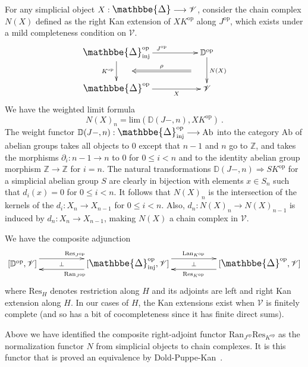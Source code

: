 \documentclass[a4paper,12pt,reqno]{amsart}
\def\makebigger#1#2#3{\hbox{#1$\mathsurround=0pt #2{#3}$}}
\def\bigger#1#2{{\relax\mathpalette{\makebigger#1}{#2}}}
\newcommand{\DelCat}{{\bigger\large{\mathbbe{\Delta}}}}
\theoremstyle{definition}
\theoremstyle{fact}
\theoremstyle{genquest}
\theoremstyle{step}
\newcommand{\lra}{\longrightarrow}
\newcommand{\Lra}{\Longrightarrow}
\def\CV{{\mathscr V}}
\begin{document}
For any simplicial object $X: \DelCat\lra \CV$, consider the
chain complex $N(X)$ defined as the right Kan extension of 
$X K^{\mathrm{op}}$ along $J^{\mathrm{op}}$, 
which exists under a mild completeness condition on $\CV$.
\begin{equation}
\begin{aligned}
\xymatrix{
\DelCat_{\mathrm{inj}}^{\mathrm{op}} \ar[d]_{K^{\mathrm{op}}}^(0.5){\phantom{aaa}}="1" \ar[rr]^{J^{\mathrm{op}}}  && \mathbb{D}^{\mathrm{op}}  \ar[d]^{N(X)}_(0.5){\phantom{aaa}}="2" \ar@{<=}"1";"2"^-{\rho}
\\
\DelCat^{\mathrm{op}}  \ar[rr]_-{X} && \CV 
}
\end{aligned}
\end{equation} 
We have the weighted limit formula
$$N(X)_n=\mathrm{lim}(\mathbb{D}(J-,n),XK^{\mathrm{op}}) \ .$$
The weight functor $\mathbb{D}(J-,n): \DelCat_{\mathrm{inj}}^{\mathrm{op}} \lra \mathrm{Ab}$
into the category $\mathrm{Ab}$ of abelian groups takes all objects to $0$
except that $n-1$ and $n$ go to $\mathbb{Z}$, and takes the morphisms
$\partial_i : n-1\lra n$ to $0$ for $0\le i <n$ and to the identity abelian group morphism $\mathbb{Z}\lra \mathbb{Z}$ for $i=n$. 
The natural transformations $\mathbb{D}(J-,n) \Lra SK^{\mathrm{op}}$ 
for a simplicial abelian group $S$ are clearly in bijection with elements
$x\in S_n$ such that $d_i(x) = 0$ for $0\le i < n$. 
It follows that $N(X)_n$ is the intersection of the kernels of the 
$d_i: X_n\lra X_{n-1}$ for $0\le i < n$.
Also, $d_n : N(X)_n\lra N(X)_{n-1}$ is induced by $d_n : X_n\lra X_{n-1}$,
making $N(X)$ a chain complex in $\CV$.    

We have the composite adjunction
\[ \xymatrix @R-3mm {
[\mathbb{D}^{\mathrm{op}},\CV] \ar@<1.5ex>[rr]^{\mathrm{Res}_{J^{\mathrm{op}}}} \ar@{}[rr]|-{\perp} && [\DelCat_{\mathrm{inj}}^{\mathrm{op}},\CV] \ar@<1.5ex>[ll]^{\mathrm{Ran}_{J^{\mathrm{op}}}} \ar@<1.5ex>[rr]^{\mathrm{Lan}_{K^{\mathrm{op}}}} \ar@{}[rr]|-{\perp} && [\DelCat^{\mathrm{op}},\CV] \ar@<1.5ex>[ll]^{\mathrm{Res}_{K^{\mathrm{op}}}} 
}\]
where $\mathrm{Res}_{H}$ denotes restriction along $H$ and its adjoints are
left and right Kan extension along $H$. In our cases of $H$, the Kan extensions
exist when $\CV$ is finitely complete (and so has a bit of cocompleteness since
it has finite direct sums).

Above we have identified the composite right-adjoint functor $\mathrm{Ran}_{J^{\mathrm{op}}} \mathrm{Res}_{K^{\mathrm{op}}}$ as the normalization functor $N$
from simplicial objects to chain complexes. 
It is this functor that is proved an equivalence by Dold-Puppe-Kan~\cite{Dold, DoldPuppe, Kan}. 
\end{document}
